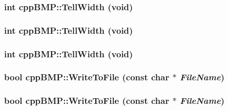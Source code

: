 \hypertarget{classcpp_b_m_p_539ec9582a0ebd2853d168eae6bfc68f}{
\subsubsection[{TellWidth}]{\setlength{\rightskip}{0pt plus 5cm}int cppBMP::TellWidth (void)}}
\label{classcpp_b_m_p_539ec9582a0ebd2853d168eae6bfc68f}


\hypertarget{classcpp_b_m_p_539ec9582a0ebd2853d168eae6bfc68f}{
\subsubsection[{TellWidth}]{\setlength{\rightskip}{0pt plus 5cm}int cppBMP::TellWidth (void)}}
\label{classcpp_b_m_p_539ec9582a0ebd2853d168eae6bfc68f}


\hypertarget{classcpp_b_m_p_539ec9582a0ebd2853d168eae6bfc68f}{
\subsubsection[{TellWidth}]{\setlength{\rightskip}{0pt plus 5cm}int cppBMP::TellWidth (void)}}
\label{classcpp_b_m_p_539ec9582a0ebd2853d168eae6bfc68f}


\hypertarget{classcpp_b_m_p_bee4a161c6d3ad3d627b70b62735259d}{
\subsubsection[{WriteToFile}]{\setlength{\rightskip}{0pt plus 5cm}bool cppBMP::WriteToFile (const char $\ast$ {\em FileName})}}
\label{classcpp_b_m_p_bee4a161c6d3ad3d627b70b62735259d}


\hypertarget{classcpp_b_m_p_bee4a161c6d3ad3d627b70b62735259d}{
\subsubsection[{WriteToFile}]{\setlength{\rightskip}{0pt plus 5cm}bool cppBMP::WriteToFile (const char $\ast$ {\em FileName})}}
\label{classcpp_b_m_p_bee4a161c6d3ad3d627b70b62735259d}


